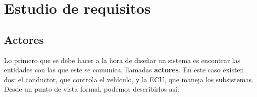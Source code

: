 \chapter{Estudio de requisitos}


\noindent{}


\section{Actores}
Lo primero que se debe hacer a la hora de diseñar un sistema es encontrar las entidades con las que este se comunica, llamadas \textbf{actores}. 
En este caso existen dos: el conductor, que controla el vehículo, y la ECU, que maneja los subsistemas. Desde un punto de vista formal, podemos describirlos así: 



